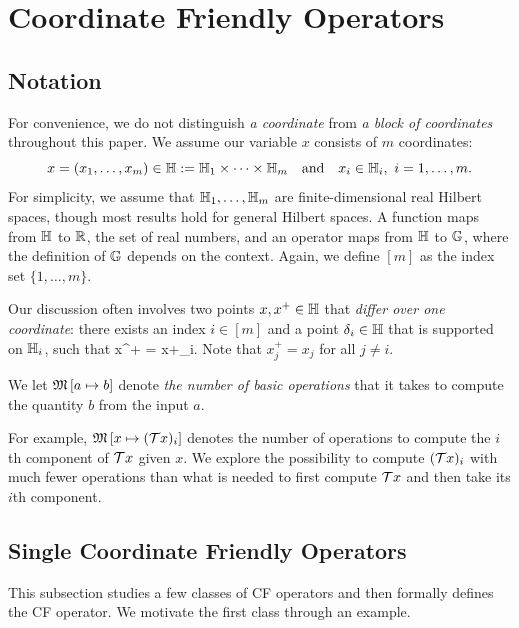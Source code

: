 \section{Coordinate Friendly Operators}\label{sec:cuf}

\subsection{Notation}
For convenience, we do not distinguish \emph{a coordinate} from \emph{a block of coordinates} throughout this paper. We assume our variable $x$ consists of $m$ coordinates: $$x = (x_1, \ldots, x_m) \in\mathbb{H} := \mathbb{H}_1 \times \cdots \times \mathbb{H}_m\quad\mbox{and}\quad x_i\in\mathbb{H}_i,~ i=1,\ldots,m.$$ For simplicity, we assume that $\mathbb{H}_1,\ldots,\mathbb{H}_m$ are finite-dimensional real Hilbert spaces, though most results hold for general Hilbert spaces.
A function maps from $\mathbb{H}$ to $\mathbb{R}$, the set of real numbers, and an operator maps from $\mathbb{H}$ to $\mathbb{G}$, where the definition of $\mathbb{G}$ depends on the context. Again, we define $[m]$ as the index set $\{1, \ldots, m\}$.

Our discussion often involves two points $x,x^+\in\mathbb{H}$ that \emph{differ over one coordinate}: there exists an index $i\in [m]$ and a point $\delta_i\in\mathbb{H}$ that is supported on $\mathbb{H}_i$, such that
\beq\label{singleupdate}
x^+ = x+\delta_i.
\eeq
Note that $x^+_j=x_j$ for all $j\not=i$.
\begin{definition}
We let $\mathfrak{M}\left[{a}\mapsto {b}\right]$ denote \emph{the number of basic operations} that it takes to compute the quantity $b$ from the  input $a$.
\end{definition}
For example, $\mathfrak{M}\left[{x}\mapsto {({\mathcal{T}}x)_i}\right]$ denotes the number of operations to compute the $i$th component of ${\mathcal{T}} x$ given $x$. We explore the possibility to compute  $({\mathcal{T}} x)_i$ with much fewer operations than what is needed to first compute ${\mathcal{T}} x$ and  then take its $i$th component. %


\subsection{Single Coordinate Friendly Operators}
This subsection studies a few classes of CF operators and then formally defines the CF operator. We motivate the first class through an example.

